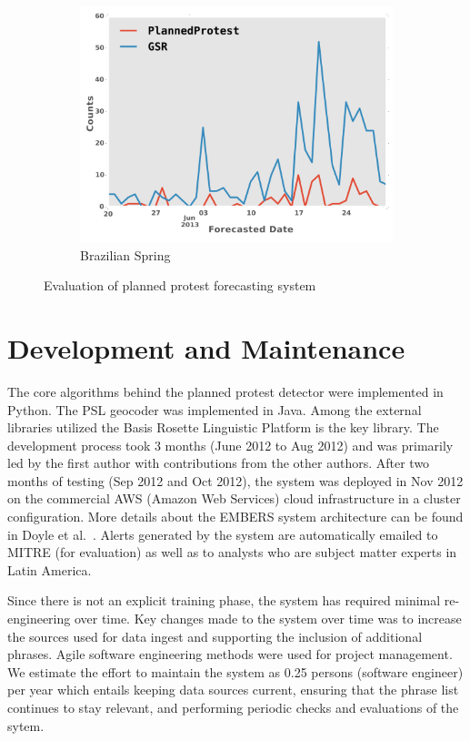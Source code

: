 \documentclass[letterpaper]{article}
\begin{document}
\begin{figure}
\begin{subfigure}{0.33\columnwidth}
  \includegraphics[width=0.85\columnwidth]{brazil_june_new}
  \caption{\scriptsize Brazilian Spring}
  \label{fig:brazil_june}
\end{subfigure}
\caption{Evaluation of planned protest forecasting system}
\end{figure}%


\section{Development and Maintenance}
The core algorithms behind the
planned protest detector were implemented in Python. The PSL geocoder was
implemented in Java. Among the external libraries utilized the Basis Rosette Linguistic Platform is the key
library. The development process took 3 months (June
2012 to Aug 2012) and was
primarily led by the first author with contributions from the other authors.
After two months of testing (Sep 2012 and Oct 2012), the system was deployed
in Nov 2012 on the commercial AWS (Amazon
Web Services) cloud infrastructure in a cluster configuration. 
More details about the EMBERS 
system architecture can be found in
Doyle et al.~. Alerts
generated by the system are automatically emailed to MITRE (for evaluation)
as well as to analysts who are subject matter experts in Latin America.

Since there is not an explicit training
phase, the system has required minimal re-engineering over time. Key changes
made to the system over time was to increase the sources used for data ingest
and supporting the inclusion of additional phrases. Agile software
engineering methods were used for project management. We estimate the
effort to maintain the system as 0.25 persons (software engineer) per year
which entails keeping data sources current, ensuring that
the phrase list continues to stay relevant, and performing periodic 
checks and evaluations of the sytem.
\end{document}
